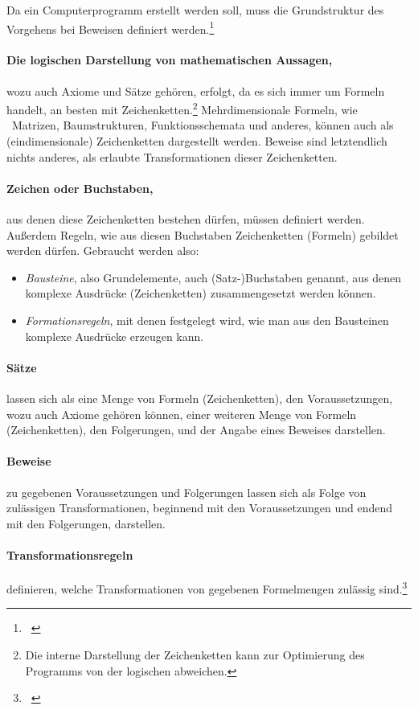 Da ein Computerprogramm erstellt werden soll, muss die Grundstruktur des Vorgehens bei Beweisen definiert werden.\footnote{\seename~\cite{bib:Kalkuel}}

\paragraph{Die logischen Darstellung von mathematischen Aussagen,} wozu auch Axiome und Sätze gehören, erfolgt, da es sich immer um Formeln handelt, an besten mit Zeichenketten.\footnote{%
	Die interne Darstellung der Zeichenketten kann zur Optimierung des Programms von der logischen abweichen.%
}
Mehrdimensionale Formeln, wie \textzB\ Matrizen, Baumstrukturen, Funktionsschemata und anderes, können auch als (eindimensionale) Zeichenketten dargestellt werden.
Beweise sind letztendlich nichts anderes, als erlaubte Transformationen dieser Zeichenketten.

\paragraph{Zeichen oder Buchstaben,} aus denen diese Zeichenketten bestehen dürfen, müssen definiert werden.
Außerdem Regeln, wie aus diesen Buchstaben Zeichenketten (Formeln) gebildet werden dürfen.
Gebraucht werden also:
\begin{itemize}
	\item \emph{Bausteine}, also Grundelemente, auch (Satz-)Buchstaben genannt, aus denen komplexe Ausdrücke (Zeichenketten) zusammengesetzt werden können.
	\item \emph{Formationsregeln}, mit denen festgelegt wird, wie man aus den Bausteinen komplexe Ausdrücke erzeugen kann.
\end{itemize}

\paragraph{Sätze} lassen sich als eine Menge von Formeln (Zeichenketten), den Voraussetzungen, wozu auch Axiome gehören können, einer weiteren Menge von Formeln (Zeichenketten), den Folgerungen, und der Angabe eines Beweises darstellen.

\paragraph{Beweise} zu gegebenen Voraussetzungen und Folgerungen lassen sich als Folge von zulässigen Transformationen, beginnend mit den Voraussetzungen und endend mit den Folgerungen, darstellen.

\paragraph{Transformationsregeln} definieren, welche Transformationen von gegebenen Formelmengen zulässig sind.\footnote{\seename~\cite{bib:Rautenberg,bib:Schlussregel,bib:NatuerlichesSchliessen}}

\Endchapter
